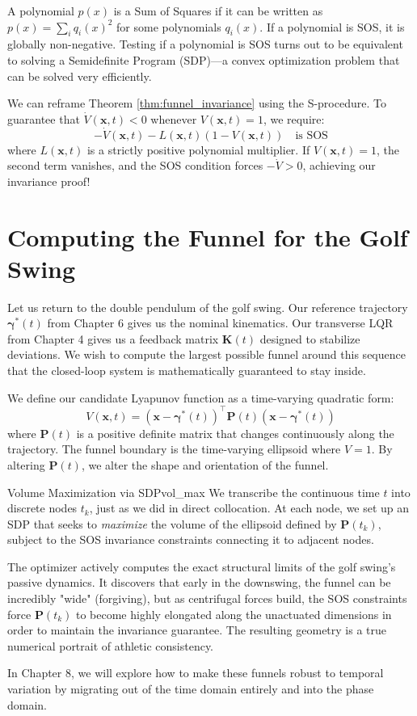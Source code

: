 \documentclass[12pt, openany]{book}
\theoremstyle{plain}
\newcommand{\state}{\bm{x}}
\newcommand{\traj}{\bm{\gamma}}
\begin{document}
A polynomial $p(x)$ is a Sum of Squares if it can be written as $p(x) = \sum_{i} q_i(x)^2$ for some polynomials $q_i(x)$. If a polynomial is SOS, it is globally non-negative. Testing if a polynomial is SOS turns out to be equivalent to solving a Semidefinite Program (SDP)—a convex optimization problem that can be solved very efficiently.

We can reframe Theorem \ref{thm:funnel_invariance} using the S-procedure. To guarantee that $\dot{V}(\state, t) < 0$ whenever $V(\state, t) = 1$, we require:
\begin{equation}
  -\dot{V}(\state, t) - L(\state, t)(1 - V(\state, t)) \quad \text{is SOS}
\end{equation}
where $L(\state, t)$ is a strictly positive polynomial multiplier. If $V(\state, t) = 1$, the second term vanishes, and the SOS condition forces $-\dot{V} > 0$, achieving our invariance proof!

\section{Computing the Funnel for the Golf Swing}

Let us return to the double pendulum of the golf swing. Our reference trajectory $\traj^*(t)$ from Chapter 6 gives us the nominal kinematics. Our transverse LQR from Chapter 4 gives us a feedback matrix $\bm{K}(t)$ designed to stabilize deviations. We wish to compute the largest possible funnel around this sequence that the closed-loop system is mathematically guaranteed to stay inside.

We define our candidate Lyapunov function as a time-varying quadratic form:
\begin{equation}
  V(\state, t) = (\state - \traj^*(t))^\top \bm{P}(t) (\state - \traj^*(t))
\end{equation}
where $\bm{P}(t)$ is a positive definite matrix that changes continuously along the trajectory. The funnel boundary is the time-varying ellipsoid where $V=1$. By altering $\bm{P}(t)$, we alter the shape and orientation of the funnel.

\begin{example}{Volume Maximization via SDP}{vol_max}
  We transcribe the continuous time $t$ into discrete nodes $t_k$, just as we did in direct collocation. At each node, we set up an SDP that seeks to \emph{maximize} the volume of the ellipsoid defined by $\bm{P}(t_k)$, subject to the SOS invariance constraints connecting it to adjacent nodes.

  The optimizer actively computes the exact structural limits of the golf swing's passive dynamics. It discovers that early in the downswing, the funnel can be incredibly "wide" (forgiving), but as centrifugal forces build, the SOS constraints force $\bm{P}(t_k)$ to become highly elongated along the unactuated dimensions in order to maintain the invariance guarantee. The resulting geometry is a true numerical portrait of athletic consistency.
\end{example}

In Chapter 8, we will explore how to make these funnels robust to temporal variation by migrating out of the time domain entirely and into the phase domain.
\end{document}
